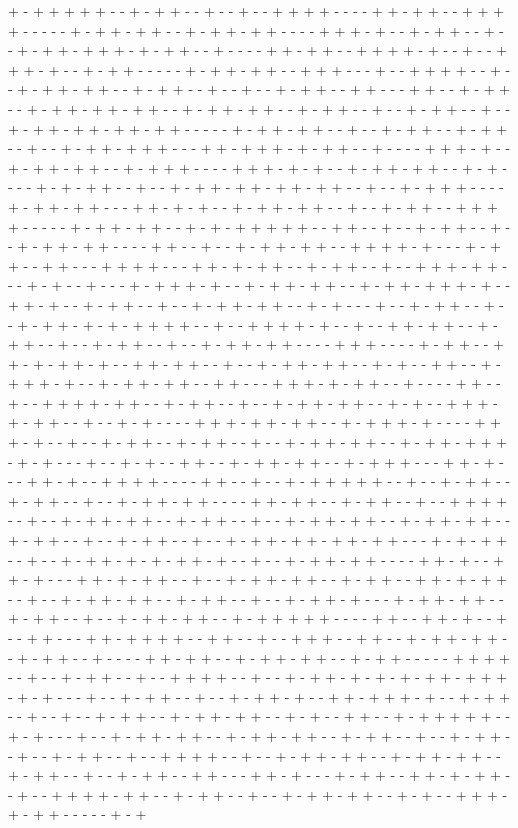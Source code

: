 + - + + + + + - - + - + + - - + - - + - - + + + + - - - - + + - + + - - + + + + - - - - - + - + + - + + - - + - + + - + + - - - - + + + - + - - + - + + - - + - - + - + + - + + + - + - + + - - + - - - - + + - + + - - + + + + - + - - + - - + + + - + - - + - + + - - - - - + - + + - + + - - + + + - - - + - - + + + + - - + - - + - + + - + + - - + - + + - - + - - + - - + - + + - - + + - - - + + - - + - + + - - + - + + - + + - + + - - + - + + - + + - - + - + + - - + - - + - + + - - + - - + - + + - + + - + + - + + - - - - - + - + + - + + - - + - - + - + + - - + - + + - - + - - + - + + - + + + - - - + + - + + + - + - + + - - + - - - - + + + - + - - + - + + - + + - - + - + + + - - - - + + + - + - + - - + - + + - + + - - + - + - - - - + - + - + + - - + - - + - + + - + + - + + - + + - - + - - + - + + + - - - - + - + + - + + - - - + + - + - + - - + - + + - + + - - + - - + - + + - - + + + + - - - - - + - + + - + + - - + - + - + + + + + - - + + - - + - - + - + + - - + - - + - + + - + + - - - - + + - - + - - + - + + - + + - - + + + + - + - - - + - + + - - + + - - - + + + + - - - + + - + - + + - - + - + + - - + - - + + + - + + - - - + - + - - + - - - + - + + + - + - - + - + + - + + - - + - + + - + + + - + - - + + - + - - + - + + - - + - - + - + + - + + - - + - + - - - + - - + - + + - - + - - + - + + - + - + - + + + + - - + - - + + + + - + - - + - - + + - + + - - + - + + - - + - - + - + + - - + - - + - + + - + + - - - - + + + - - - - + - + + - - + + - + - + + - + - - + + - + + - - + - - + - + + - + + - - + - + - - + + - - + - + + + - + - - + - + + - + + - - + + - - - + + + - + - + + - - + - - - - + + - - + - - + + + + - + + - - + - + + - - + - - + - + + - + + - - + - + - - + + + - + - + + - - + - - + - + - - - - + + + - + + - + + - - + - + + + - + - - - - + + + - + - - + - - + - + + - - + - + + - - + - - + - + + - + + - - + - + + - + + + - + - + - - - + - - + - + - - + + - - + - + + - + + - - + - + + + - - - + + - + - - - + + - + - - + + + + - - - - + + - - + - - + - + + + + + - - + - - + - + + - - + - + + - - + - - + - + + - + + - - - - + + - + + - - + - + + - - + - - + + + + - - + - - + - + + - + + - - + - + + - - + - - + - + + - + + - - + - + + - + + - - + - + + - - + - - + - + + - - + - - + - + + - + + - + + - + + - - - + - + - + + - - + - - + - + + - + - + - + + - + - - + - - + - + + - + + - - - - + + - + - - + + - + - - - + + - + - + + - - + - - + - + + - + + - - + - + + - - + + - + - + + - - + - - + - + + - + + - - + - + + - - + - - + - + + - + - - - + - + + - + + - - + - + + - - + - - + - + + - + + - - + - + + + + + - - - - + + - - + + - + - - + - - + + - - - + + - + + + + - - + + - - + - - + + + - - + + - - + - + + - + + - - + - + + - - + - - - - + + - + + - - + - + + - + + - - + - + + - - - - - + + + + - - + - - + - + + - - + - - + + + + - - + - - + - + + - + - + - + - + + - + + + - + - + - - - + - - + - + + - - + - - + - + + - + - - + + - + + + - + - - + - + + - - + - - + - - + - + + - - + - + + - + + - - + - + - - + + - - + - + + + + + - - + - + - - - + - - + - + + - + + - - + - + + - + + - - + - + + - - + - - + - + + - - + - - + - + + - - + - - + + + + - - + - - + - + + - + + - - + - + + - + + - - + - + + - - + - - + - + + - - + + - - - + + - + - - - + - + + - - + + - + - + + - - + - - + + + + - + + - - + - + + - - + - - + - + + - + + - - + - + - - + + + - + - + + - - - - - + - + 